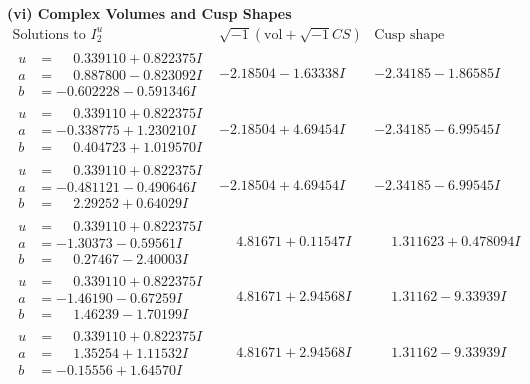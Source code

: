 \documentclass[1p]{elsarticle_modified}
\theoremstyle{definition}
\newcommand{\I}{\sqrt{-1}}
\begin{document}
\newpage\flushleft \textbf{(vi) Complex Volumes and Cusp Shapes}
$$\begin{array}{c|c|c}  
\text{Solutions to }I^u_{2}& \I (\text{vol} + \sqrt{-1}CS) & \text{Cusp shape}\\
 \hline 
\begin{aligned}
u &= \phantom{-}0.339110 + 0.822375 I \\
a &= \phantom{-}0.887800 - 0.823092 I \\
b &= -0.602228 - 0.591346 I\end{aligned}
 & -2.18504 - 1.63338 I & -2.34185 - 1.86585 I \\ \hline\begin{aligned}
u &= \phantom{-}0.339110 + 0.822375 I \\
a &= -0.338775 + 1.230210 I \\
b &= \phantom{-}0.404723 + 1.019570 I\end{aligned}
 & -2.18504 + 4.69454 I & -2.34185 - 6.99545 I \\ \hline\begin{aligned}
u &= \phantom{-}0.339110 + 0.822375 I \\
a &= -0.481121 - 0.490646 I \\
b &= \phantom{-}2.29252 + 0.64029 I\end{aligned}
 & -2.18504 + 4.69454 I & -2.34185 - 6.99545 I \\ \hline\begin{aligned}
u &= \phantom{-}0.339110 + 0.822375 I \\
a &= -1.30373 - 0.59561 I \\
b &= \phantom{-}0.27467 - 2.40003 I\end{aligned}
 & \phantom{-}4.81671 + 0.11547 I & \phantom{-}1.311623 + 0.478094 I \\ \hline\begin{aligned}
u &= \phantom{-}0.339110 + 0.822375 I \\
a &= -1.46190 - 0.67259 I \\
b &= \phantom{-}1.46239 - 1.70199 I\end{aligned}
 & \phantom{-}4.81671 + 2.94568 I & \phantom{-}1.31162 - 9.33939 I \\ \hline\begin{aligned}
u &= \phantom{-}0.339110 + 0.822375 I \\
a &= \phantom{-}1.35254 + 1.11532 I \\
b &= -0.15556 + 1.64570 I\end{aligned}
 & \phantom{-}4.81671 + 2.94568 I & \phantom{-}1.31162 - 9.33939 I \\ \hline\begin{aligned}

\end{aligned}
\end{array}$$
\end{document}
